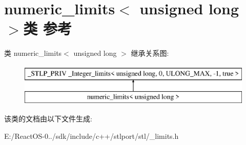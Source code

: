 \hypertarget{classnumeric__limits_3_01unsigned_01long_01_4}{}\section{numeric\+\_\+limits$<$ unsigned long $>$类 参考}
\label{classnumeric__limits_3_01unsigned_01long_01_4}
类 numeric\+\_\+limits$<$ unsigned long $>$ 继承关系图\+:\begin{figure}[H]
\begin{center}
\leavevmode
\includegraphics[height=2.000000cm]{classnumeric__limits_3_01unsigned_01long_01_4}
\end{center}
\end{figure}


该类的文档由以下文件生成\+:\begin{DoxyCompactItemize}
\item 
E\+:/\+React\+O\+S-\/0../sdk/include/c++/stlport/stl/\+\_\+limits.\+h\end{DoxyCompactItemize}
